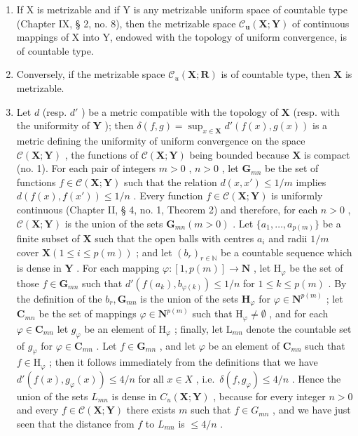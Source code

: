 \begin{enumerate}
\def\labelenumi{\alph{enumi})}
\item
  If X is metrizable and if Y is any metrizable uniform space of countable type (Chapter IX, § 2, no. 8), then the metrizable space \(\mathcal{C}_{\mathbf{u}}(\mathbf{X};\mathbf{Y})\) of continuous mappings of X into Y, endowed with the topology of uniform convergence, is of countable type.
\item
  Conversely, if the metrizable space \(\mathcal{C}_{u}(\mathbf{X};\mathbf{R})\) is of countable type, then \(\mathbf{X}\) is metrizable.
\item
  Let \(d\) (resp. \(d'\) ) be a metric compatible with the topology of \(\mathbf{X}\) (resp. with the uniformity of \(\mathbf{Y}\) ); then \(\delta(f, g) = \sup_{x \in \mathbf{X}} d'(f(x), g(x))\) is a metric defining the uniformity of uniform convergence on the space \(\mathcal{C}(\mathbf{X}; \mathbf{Y})\) , the functions of \(\mathcal{C}(\mathbf{X}; \mathbf{Y})\) being bounded because \(\mathbf{X}\) is compact (no. 1). For each pair of integers \(m > 0\) , \(n > 0\) , let \(\mathbf{G}_{mn}\) be the set of functions \(f \in \mathcal{C}(\mathbf{X};\mathbf{Y})\) such that the relation \(d(x,x') \leqslant 1 / m\) implies \(d(f(x),f(x')) \leqslant 1 / n\) . Every function \(f \in \mathcal{C}(\mathbf{X};\mathbf{Y})\) is uniformly continuous (Chapter II, § 4, no. 1, Theorem 2) and therefore, for each \(n > 0\) , \(\mathcal{C}(\mathbf{X};\mathbf{Y})\) is the union of the sets \(\mathbf{G}_{mn}(m > 0)\) . Let \(\{a_1,\dots ,a_{p(m)}\}\) be a finite subset of \(\mathbf{X}\) such that the open balls with centres \(a_i\) and radii \(1 / m\) cover \(\mathbf{X}(1\leqslant i\leqslant p(m))\) ; and let \((b_r)_{r\in \mathbb{N}}\) be a countable sequence which is dense in \(\mathbf{Y}\) . For each mapping \(\varphi :[1,p(m)]\to \mathbf{N}\) , let \(\mathrm{H}_{\varphi}\) be the set of those \(f\in \mathbf{G}_{mn}\) such that \(d'(f(a_k),b_{\varphi (k)})\leqslant 1 / n\) for \(1\leqslant k\leqslant p(m)\) . By the definition of the \(b_r,\mathbf{G}_{mn}\) is the union of the sets \(\mathbf{H}_{\varphi}\) for \(\varphi \in \mathbf{N}^{p(m)}\) ; let \(\mathbf{C}_{mn}\) be the set of mappings \(\varphi \in \mathbf{N}^{p(m)}\) such that \(\mathrm{H}_{\varphi}\neq \emptyset\) , and for each \(\varphi \in \mathbf{C}_{mn}\) let \(g_{\varphi}\) be an element of \(\mathrm{H}_{\varphi}\) ; finally, let \(\mathrm{L}_{mn}\) denote the countable set of \(g_{\varphi}\) for \(\varphi \in \mathbf{C}_{mn}\) . Let \(f\in \mathbf{G}_{mn}\) , and let \(\varphi\) be an element of \(\mathbf{C}_{mn}\) such that \(f\in \mathrm{H}_{\varphi}\) ; then it follows immediately from the definitions that we have \(d'(f(x),g_{\varphi}(x))\leqslant 4 / n\) for all \(x\in X\) , i.e.~\(\delta (f,g_{\varphi})\leqslant 4 / n\) . Hence the union of the sets \(L_{mn}\) is dense in \(C_u(\mathbf{X};\mathbf{Y})\) , because for every integer \(n > 0\) and every \(f\in \mathcal{C}(\mathbf{X};\mathbf{Y})\) there exists \(m\) such that \(f\in G_{mn}\) , and we have just seen that the distance from \(f\) to \(L_{mn}\) is \(\leqslant 4 / n\) .

\end{enumerate}
